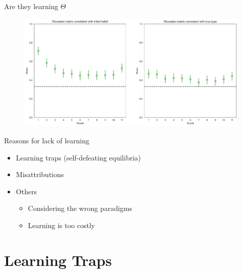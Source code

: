 \documentclass[aspectratio=169]{beamer}
\begin{document}
\begin{frame}{Are they learning $\Theta$}
    \begin{figure}
        \centering
        \includegraphics[scale=.4]{last_button_consistency.png}
    \end{figure}
    
\end{frame}

\begin{frame}{Reasons for lack of learning}
\begin{itemize}
    \item Learning traps (self-defeating equilibria)
    \bigskip 
    \item Misattributions
    \bigskip
    \item Others
    \begin{itemize}
        \item Considering the wrong paradigms
        \item Learning is too costly
    \end{itemize}
    
\end{itemize}

\end{frame}

\section*{Learning Traps}
\end{document}

